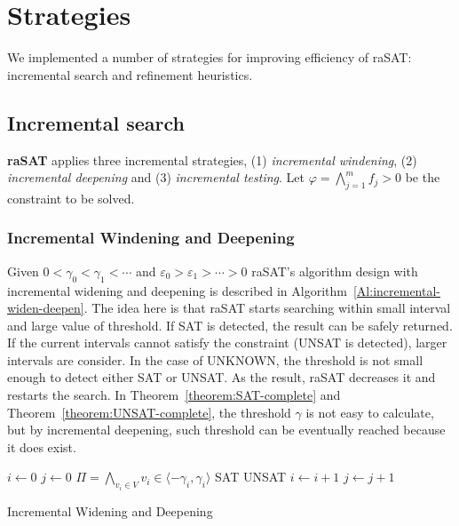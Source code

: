 \chapter{Strategies} \label{chap:strate}
We implemented a number of strategies for improving efficiency of raSAT: incremental search and refinement heuristics.
\section{Incremental search} \label{sec:incsearch}
{\bf raSAT} applies three incremental strategies, 
(1) {\em incremental windening}, (2) {\em incremental deepening} and (3) {\em incremental testing}. 
Let
$\varphi = \bigwedge \limits_{j=1}^m f_j > 0$ be the constraint to be solved.

\subsection{Incremental Windening and Deepening}
Given $0 < \gamma_0 < \gamma_1 < \cdots$ and $\varepsilon_0 > \varepsilon_1 > \cdots > 0$ raSAT's algorithm design with incremental widening and deepening is described in Algorithm~\ref{Al:incremental-widen-deepen}. The idea here is that raSAT starts searching within small interval and large value of threshold. If SAT is detected, the result can be safely returned. If the current intervals cannot satisfy the constraint (UNSAT is detected), larger intervals are consider. In the case of UNKNOWN, the threshold is not small enough to detect either SAT or UNSAT. As the result, raSAT decreases it and restarts the search. In Theorem~\ref{theorem:SAT-complete} and Theorem~\ref{theorem:UNSAT-complete}, the threshold $\gamma$ is not easy to calculate, but by incremental deepening, such threshold can be eventually reached because it does exist.
\begin{algorithm}
\begin{algorithmic}[1]
\State $i\gets 0$
\State $j\gets 0$
	\State $\Pi = \bigwedge\limits_{v_i \in V} v_i \in \langle -\gamma_i, \gamma_i \rangle$ 
		\State \Return SAT
			\State \Return UNSAT
		\Else 
			\State $i \gets i + 1$
		\EndIf
	\Else 
		\State $j \gets j + 1$
	\EndIf
\EndWhile
\end{algorithmic}
\caption{Incremental Widening and Deepening}
\label{Al:incremental-widen-deepen}
\end{algorithm}
